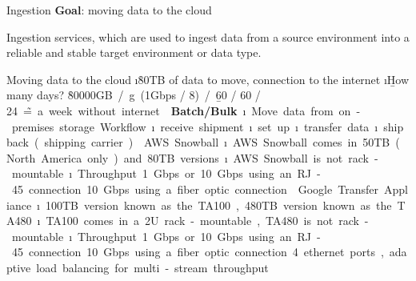 \begin{frame}[allowframebreaks]{Ingestion}
\textbf{Goal}: moving data to the cloud

Ingestion services, which are used to ingest data from a source environment into a reliable and stable target environment or data type.

Moving data to the cloud
\i \r{80TB} of data to move,  connection to the internet
\i \b{How many days}? 
\si \r{80000GB} / \g{(1Gbps / 8)} / \b{60 / 60 / 24} \~= a week without internet

\framebreak
\textbf{Batch/Bulk}
\i Move data from on-premises storage

Workflow 
\i receive shipment
\i set up
\i  transfer data
\i ship back ( shipping carrier)

\framebreak
AWS Snowball
\i AWS Snowball comes in 50TB (North America only) and 80TB versions
\i AWS Snowball is not rack-mountable
\i Throughput
\si 1 Gbps or 10 Gbps using an RJ-45 connection
\si 10 Gbps using a fiber optic connection

\framebreak
Google Transfer Appliance
\i 100TB version known as the TA100, 480TB version known as the TA480	
\i TA100 comes in a 2U rack-mountable, TA480 is not rack-mountable
\i Throughput
\si 1 Gbps or 10 Gbps using an RJ-45 connection
\si 10 Gbps using a fiber optic connection
\si 4 ethernet ports, adaptive load balancing for multi-stream throughput


\end{frame}
